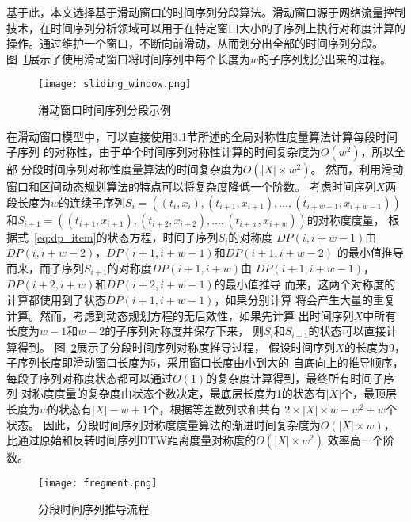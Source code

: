 基于此，本文选择基于滑动窗口的时间序列分段算法。滑动窗口源于网络流量控制
技术，在时间序列分析领域可以用于在特定窗口大小的子序列上执行对称度计算的
操作。通过维护一个窗口，不断向前滑动，从而划分出全部的时间序列分段。
图~\ref{fig:sliding_window}展示了使用滑动窗口将时间序列中每个长度为$w$的子序列划分出来的过程。

\begin{figure}
  \centering
  \texttt{[image: sliding\_window.png]}
  \caption{滑动窗口时间序列分段示例}
  \label{fig:sliding_window}
\end{figure}

在滑动窗口模型中，可以直接使用3.1节所述的全局对称性度量算法计算每段时间子序列
的对称性，由于单个时间序列对称性计算的时间复杂度为$O(w^2 )$，所以全部
分段时间序列对称性度量算法的时间复杂度为$O\left(|X| \times w^{2}\right)$。
然而，利用滑动窗口和区间动态规划算法的特点可以将复杂度降低一个阶数。
考虑时间序列$X$两段长度为$w$的连续子序列$S_{i}=\left(\left(t_{i}, x_{i}\right),\left(t_{i+1}, x_{i+1}\right), \dots,\left(t_{i+w-1}, x_{i+w-1}\right)\right)$
和$S_{i+1}=\left(\left(t_{i+1}, x_{i+1}\right),\left(t_{i+2}, x_{i+2}\right), \dots,\left(t_{i+w}, x_{i+w}\right)\right)$的对称度度量，
根据式~\ref{eq:dp_item}的状态方程，时间子序列$S_i$的对称度
$D P(i, i+w-1)$由$DP(i,i+w-2)$，$DP(i+1,i+w-1)$和$DP(i+1,i+w-2)$
的最小值推导而来，而子序列$S_{i+1}$的对称度$D P(i+1, i+w)$由
$D P(i+1, i+w-1)$，$DP(i+2,i+w)$和$DP(i+2,i+w-1)$的最小值推导
而来，这两个对称度的计算都使用到了状态$DP(i+1,i+w-1)$，如果分别计算
将会产生大量的重复计算。然而，考虑到动态规划方程的无后效性，如果先计算
出时间序列$X$中所有长度为$w-1$和$w-2$的子序列对称度并保存下来，
则$S_i$和$S_{i+1}$的状态可以直接计算得到。
图~\ref{fig:fregment}展示了分段时间序列对称度推导过程，
假设时间序列$X$的长度为9，子序列长度即滑动窗口长度为5，采用窗口长度由小到大的
自底向上的推导顺序，每段子序列对称度状态都可以通过$O(1)$的复杂度计算得到，最终所有时间子序列
对称度度量的复杂度由状态个数决定，最底层长度为1的状态有$|X|$个，最顶层
长度为$w$的状态有$|X|-w+1$个，根据等差数列求和共有
$2 \times|X| \times w-w^{2}+w$个状态。
因此，分段时间序列对称度度量算法的渐进时间复杂度为$O(|X| \times w)$，
比通过原始和反转时间序列DTW距离度量对称度的$O\left(|X| \times w^{2}\right)$
效率高一个阶数。
\begin{figure}
  \centering
  \texttt{[image: fregment.png]}
  \caption{分段时间序列推导流程}
  \label{fig:fregment}
\end{figure}

